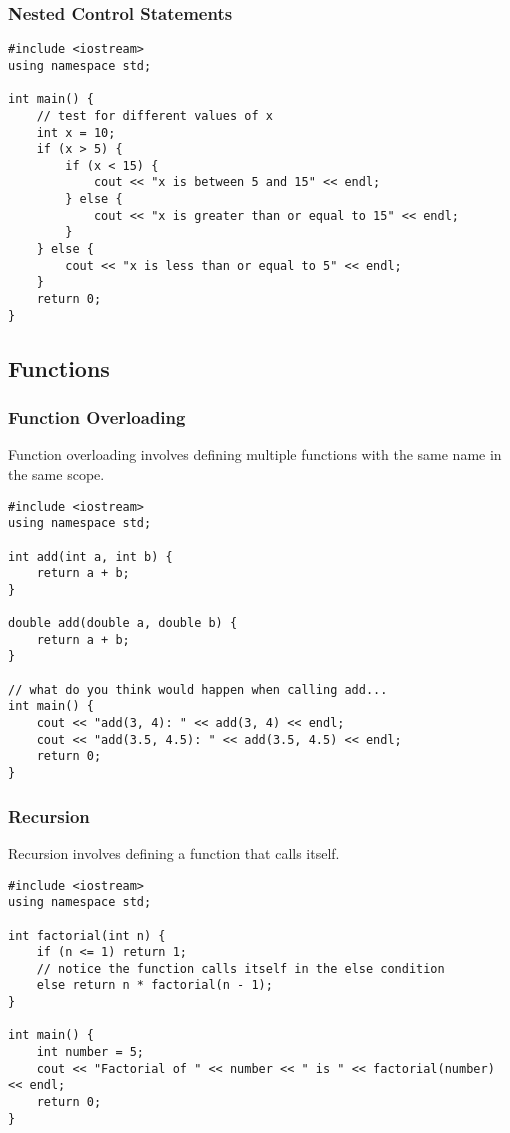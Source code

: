 \documentclass{article}
\begin{document}
\subsubsection*{Nested Control Statements}

\begin{verbatim}
#include <iostream>
using namespace std;

int main() {
    // test for different values of x
    int x = 10;
    if (x > 5) {
        if (x < 15) {
            cout << "x is between 5 and 15" << endl;
        } else {
            cout << "x is greater than or equal to 15" << endl;
        }
    } else {
        cout << "x is less than or equal to 5" << endl;
    }
    return 0;
}
\end{verbatim}

\subsection*{Functions}
\subsubsection*{Function Overloading}
Function overloading involves defining multiple functions with the same name in the same scope.


\begin{verbatim}
#include <iostream>
using namespace std;

int add(int a, int b) {
    return a + b;
}

double add(double a, double b) {
    return a + b;
}

// what do you think would happen when calling add...
int main() {
    cout << "add(3, 4): " << add(3, 4) << endl;
    cout << "add(3.5, 4.5): " << add(3.5, 4.5) << endl;
    return 0;
}
\end{verbatim}

\subsubsection*{Recursion}
Recursion involves defining a function that calls itself.

\begin{verbatim}
#include <iostream>
using namespace std;

int factorial(int n) {
    if (n <= 1) return 1;
    // notice the function calls itself in the else condition
    else return n * factorial(n - 1);
}

int main() {
    int number = 5;
    cout << "Factorial of " << number << " is " << factorial(number) << endl;
    return 0;
}
\end{verbatim}
\end{document}
